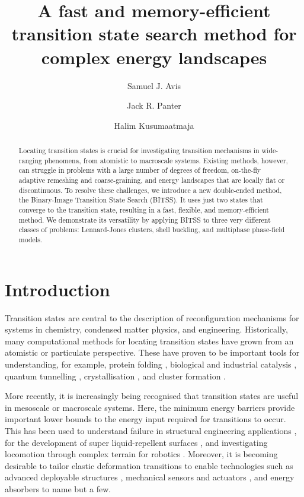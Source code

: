 \documentclass[twocolumn,10pt]{revtex4}
\begin{document}
\title{A fast and memory-efficient transition state search method for complex energy landscapes}
\author{Samuel J. Avis}
\author{Jack R. Panter}
\author{Halim Kusumaatmaja}

\begin{abstract}
  Locating transition states is crucial for investigating transition mechanisms in wide-ranging phenomena, from atomistic to macroscale systems.
  Existing methods, however, can struggle in problems with a large number of degrees of freedom, on-the-fly adaptive remeshing and coarse-graining, and energy landscapes that are locally flat or discontinuous.
  To resolve these challenges, we introduce a new double-ended method, the Binary-Image Transition State Search (BITSS).
  It uses just two states that converge to the transition state, resulting in a fast, flexible, and memory-efficient method.
  We demonstrate its versatility by applying BITSS to three very different classes of problems: Lennard-Jones clusters, shell buckling, and multiphase phase-field models.
\end{abstract}

\maketitle


\section{Introduction}
Transition states are central to the description of reconfiguration mechanisms for systems in chemistry, condensed matter physics, and engineering.
Historically, many computational methods for locating transition states have grown from an atomistic or particulate perspective.
These have proven to be important tools for understanding, for example, protein folding \cite{Bryngelson1995,Onuchic1997}, biological and industrial catalysis \cite{Boehr2006,Kerns2015,Guo2018a}, quantum tunnelling \cite{Richardson2016,Vaillant2019}, crystallisation \cite{Richard2018}, and cluster formation \cite{Wales1998,Wales2012}.

More recently, it is increasingly being recognised that transition states are useful in mesoscale or macroscale systems.
Here, the minimum energy barriers provide important lower bounds to the energy input required for transitions to occur.
This has been used to understand failure in structural engineering applications \cite{Panter2019,Hutchinson2018}, for the development of super liquid-repellent surfaces \cite{Zhang2014,Panter2019b,Amabili2017}, and investigating locomotion through complex terrain for robotics \cite{Othayoth2020}.
Moreover, it is becoming desirable to tailor elastic deformation transitions to enable technologies such as advanced deployable structures \cite{Filipov2015,Zhai2018}, mechanical sensors and actuators \cite{Bertoldi2017,Truby2016,Chi2022,Bonfanti2020}, and energy absorbers \cite{Shan2015,Giri2021} to name but a few.
\end{document}
